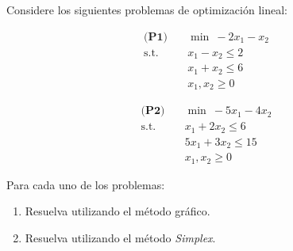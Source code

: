 Considere los siguientes problemas de optimización lineal:

\begin{center}
\begin{minipage}{0.45\textwidth}
\begin{align*}
\textbf{(P1)} \quad & \min \ -2x_1 - x_2 \\
\text{s.t.} \quad &x_1 - x_2 \leq 2 \\
& x_1 + x_2 \leq 6 \\
& x_1, x_2 \geq 0
\end{align*}
\end{minipage}
\hfill
\begin{minipage}{0.45\textwidth}
\begin{align*}
\textbf{(P2)} \quad & \min \ -5x_1 - 4x_2 \\
\text{s.t.} \quad &x_1 + 2x_2 \leq 6 \\
& 5x_1 + 3x_2 \leq 15 \\
& x_1, x_2 \geq 0
\end{align*}
\end{minipage}
\end{center}

Para cada uno de los problemas:

\begin{enumerate}
    \item[(a)] Resuelva utilizando el método gráfico.

    \item[(b)] Resuelva utilizando el método \textit{Simplex}.

\end{enumerate}


